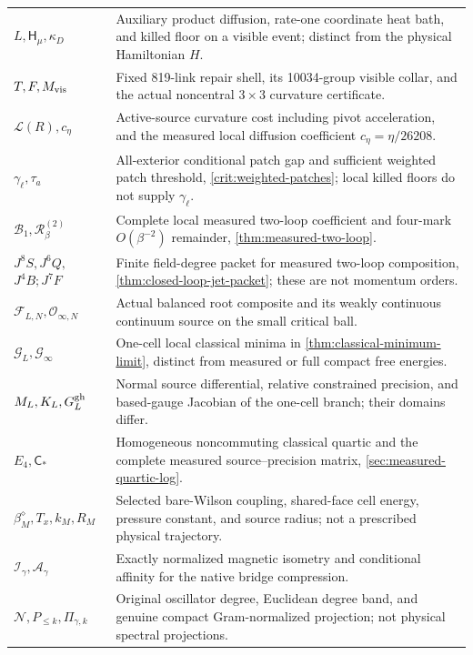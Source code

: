 \documentclass[11pt,oneside,openany]{book}
\theoremstyle{definition}
\theoremstyle{remark}
\begin{document}
\begin{longtable}{L{0.23\textwidth}L{0.70\textwidth}}
$L,\mathsf H_\mu,\kappa_D$ & Auxiliary product diffusion, rate-one coordinate heat bath, and killed floor on a visible event; distinct from the physical Hamiltonian $H$. \\
$T,F,M_{\rm vis}$ & Fixed 819-link repair shell, its 10034-group visible collar, and the actual noncentral $3\times3$ curvature certificate. \\
$\mathcal L(R),c_\eta$ & Active-source curvature cost including pivot acceleration, and the measured local diffusion coefficient $c_\eta=\eta/26208$. \\
$\gamma_\ell,\tau_a$ & All-exterior conditional patch gap and sufficient weighted patch threshold, \cref{crit:weighted-patches}; local killed floors do not supply $\gamma_\ell$. \\

$\mathcal B_1,\mathcal R_\beta^{(2)}$ & Complete local measured two-loop coefficient and four-mark $O(\beta^{-2})$ remainder, \cref{thm:measured-two-loop}. \\
$J^8S,J^6Q,$\newline $J^4B;J^7F$ & Finite field-degree packet for measured two-loop composition, \cref{thm:closed-loop-jet-packet}; these are not momentum orders. \\
$\mathcal F_{L,N},\mathcal O_{\infty,N}$ & Actual balanced root composite and its weakly continuous continuum source on the small critical ball. \\
$\mathcal G_L,\mathcal G_\infty$ & One-cell local classical minima in \cref{thm:classical-minimum-limit}, distinct from measured or full compact free energies. \\

$M_L,K_L,G_L^{\rm gh}$ & Normal source differential, relative constrained precision, and based-gauge Jacobian of the one-cell branch; their domains differ. \\
$E_4,\mathsf C_*$ & Homogeneous noncommuting classical quartic and the complete measured source--precision matrix, \cref{sec:measured-quartic-log}. \\
$\beta_M^\diamond,T_x,k_M,R_M$ & Selected bare-Wilson coupling, shared-face cell energy, pressure constant, and source radius; not a prescribed physical trajectory. \\
$\mathcal I_\gamma,\mathcal A_\gamma$ & Exactly normalized magnetic isometry and conditional affinity for the native bridge compression. \\
$\mathcal N,P_{\le k},\Pi_{\gamma,k}$ & Original oscillator degree, Euclidean degree band, and genuine compact Gram-normalized projection; not physical spectral projections. \\


\end{longtable}
\end{document}
